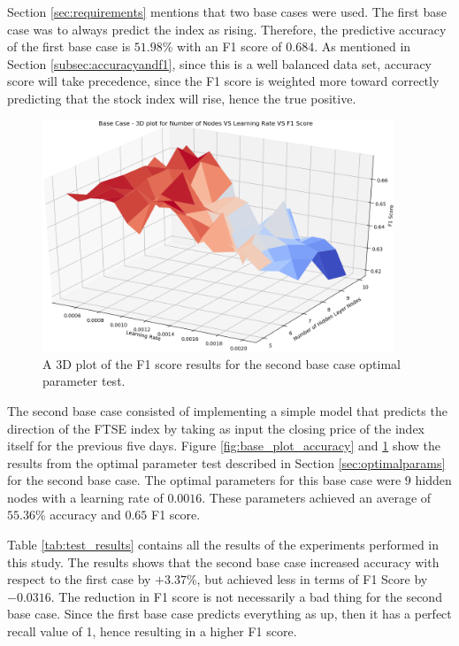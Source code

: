 \documentclass{UoYCSproject}
\begin{document}
Section \ref{sec:requirements} mentions that two base cases were used. The first base case was to always predict the index as rising. Therefore, the predictive accuracy of the first base case is $51.98$\% with an F1 score of $0.684$. As mentioned in Section \ref{subsec:accuracyandf1}, since this is a well balanced data set, accuracy score will take precedence, since the F1 score is weighted more toward correctly predicting that the stock index will rise, hence the true positive.

\begin{figure}[h]
\includegraphics[width=10.5cm]{base_f1.png}
\centering
\caption{A 3D plot of the F1 score results for the second base case optimal parameter test.} 
\label{fig:base_plot_f1}
\end{figure}

The second base case consisted of implementing a simple model that predicts the direction of the FTSE index by taking as input the closing price of the index itself for the previous five days. Figure \ref{fig:base_plot_accuracy} and \ref{fig:base_plot_f1} show the results from the optimal parameter test described in Section \ref{sec:optimalparams} for the second base  case. The optimal parameters for this base case were $9$ hidden nodes with a learning rate of $0.0016$. These parameters achieved an average of $55.36$\% accuracy and $0.65$ F1 score.

Table \ref{tab:test_results} contains all the results of the experiments performed in this study. The results shows that the second base case increased accuracy with respect to the first case by $+3.37$\%, but achieved less in terms of F1 Score by $-0.0316$. The reduction in F1 score is not necessarily a bad thing for the second base case. Since the first base case predicts everything as up, then it has a perfect recall value of 1, hence resulting in a higher F1 score. 
\end{document}
